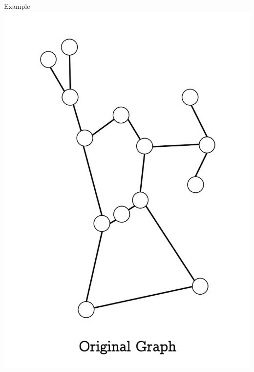 \documentclass[unknownkeysallowed]{beamer}
\begin{document}

\begin{frame}{Example}
\centering\includegraphics[height=0.8\textheight]{assets/eg-fire/0}
\end{frame}
\end{document}
